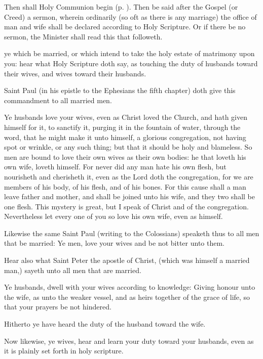 \begin{rubric}
	Then shall Holy Communion begin (p. \pageref{MatrimonyMass}). Then be said after the Gospel (or Creed) a sermon, wherein ordinarily (so oft as there is any marriage) the office of man and wife shall be declared according to Holy Scripture. Or if there be no sermon, the Minister shall read this that followeth.
\end{rubric}
 ye which be married, or which intend to take the holy estate of matrimony upon you: hear what Holy Scripture doth say, as touching the duty of husbands toward their wives, and wives toward their husbands.\par
    Saint Paul (in his epistle to the Ephesians the fifth chapter) doth give this commandment to all married men.\par
    Ye husbands love your wives, even as Christ loved the Church, and hath given himself for it, to sanctify it, purging it in the fountain of water, through the word, that he might make it unto himself, a glorious congregation, not having spot or wrinkle, or any such thing; but that it should be holy and blameless. So men are bound to love their own wives as their own bodies: he that loveth his own wife, loveth himself. For never did any man hate his own flesh, but nourisheth and cherisheth it, even as the Lord doth the congregation, for we are members of his body, of his flesh, and of his bones. For this cause shall a man leave father and mother, and shall be joined unto his wife, and they two shall be one flesh. This mystery is great, but I speak of Christ and of the congregation. Nevertheless let every one of you so love his own wife, even as himself.\par
    Likewise the same Saint Paul (writing to the Colossians) speaketh thus to all men that be married: Ye men, love your wives and be not bitter unto them.\par
    Hear also what Saint Peter the apostle of Christ, (which was himself a married man,) sayeth unto all men that are married.\par
    Ye husbands, dwell with your wives according to knowledge: Giving honour unto the wife, as unto the weaker vessel, and as heirs together of the grace of life, so that your prayers be not hindered.\par
    Hitherto ye have heard the duty of the husband toward the wife.\par
    Now likewise, ye wives, hear and learn your duty toward your husbands, even as it is plainly set forth in holy scripture.\par
